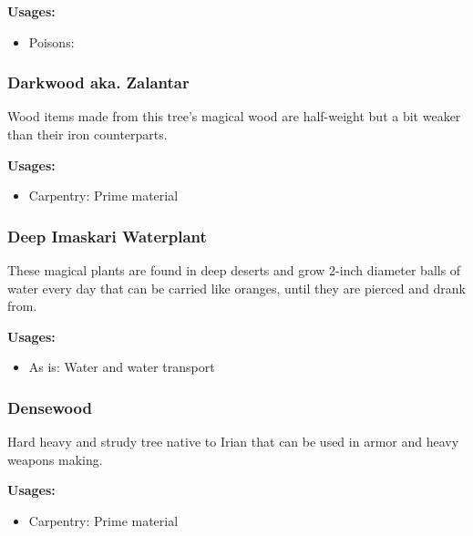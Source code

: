 \textbf{Usages:}

\begin{itemize}[noitemsep]
\item[] Poisons: \poison\poison
\end{itemize}

\subsubsection{Darkwood aka. Zalantar}

Wood items made from this tree's magical wood are half-weight but a bit weaker than their iron counterparts.

\vspace{5mm}

\textbf{Usages:}

\begin{itemize}[noitemsep]
\item[] Carpentry: Prime material
\end{itemize}

\subsubsection{Deep Imaskari Waterplant}
\label{Deep Imaskari Waterplant}

These magical plants are found in deep deserts and grow 2-inch diameter balls of water every day that can be carried like oranges, until they are pierced and drank from.

\vspace{5mm}

\textbf{Usages:}

\begin{itemize}[noitemsep]
\item[] As is: Water and water transport
\end{itemize}

\subsubsection{Densewood}

Hard heavy and strudy tree native to Irian that can be used in armor and heavy weapons making.

\vspace{5mm}

\textbf{Usages:}

\begin{itemize}[noitemsep]
\item[] Carpentry: Prime material
\end{itemize}

